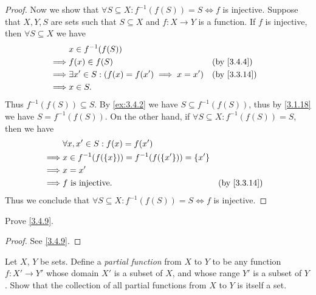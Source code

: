 \begin{proof}
  Now we show that \(\forall S \subseteq X : f^{-1}(f(S)) = S \iff f\) is injective.
  Suppose that \(X, Y, S\) are sets such that \(S \subseteq X\) and \(f : X \to Y\) is a function.
  If \(f\) is injective, then \(\forall S \subseteq X\) we have
  \begin{align*}
             & x \in f^{-1}(f(S))                                                 \\
    \implies & f(x) \in f(S)                                     &  & \by{3.4.4}  \\
    \implies & \exists x' \in S : (f(x) = f(x') \implies x = x') &  & \by{3.3.14} \\
    \implies & x \in S.
  \end{align*}
  Thus \(f^{-1}(f(S)) \subseteq S\).
  By \cref{ex:3.4.2} we have \(S \subseteq f^{-1}(f(S))\), thus by \cref{3.1.18} we have \(S = f^{-1}(f(S))\).
  On the other hand, if \(\forall S \subseteq X : f^{-1}(f(S)) = S\), then we have
  \begin{align*}
             & \forall x, x' \in S : f(x) = f(x')                                         \\
    \implies & x \in f^{-1}(f(\set{x})) = f^{-1}(f(\set{x'})) = \set{x'}                  \\
    \implies & x = x'                                                                     \\
    \implies & f \text{ is injective}.                                   &  & \by{3.3.14}
  \end{align*}
  Thus we conclude that \(\forall S \subseteq X : f^{-1}(f(S)) = S \iff f\) is injective.
\end{proof}

\begin{ex}\label{ex:3.4.6}
  Prove \cref{3.4.9}.
\end{ex}

\begin{proof}
  See \cref{3.4.9}.
\end{proof}

\begin{ex}\label{ex:3.4.7}
  Let \(X\), \(Y\) be sets.
  Define a \emph{partial function} from \(X\) to \(Y\) to be any function \(f : X' \to Y'\) whose domain \(X'\) is a subset of \(X\), and whose range \(Y'\) is a subset of \(Y\).
  Show that the collection of all partial functions from \(X\) to \(Y\) is itself a set.
\end{ex}

